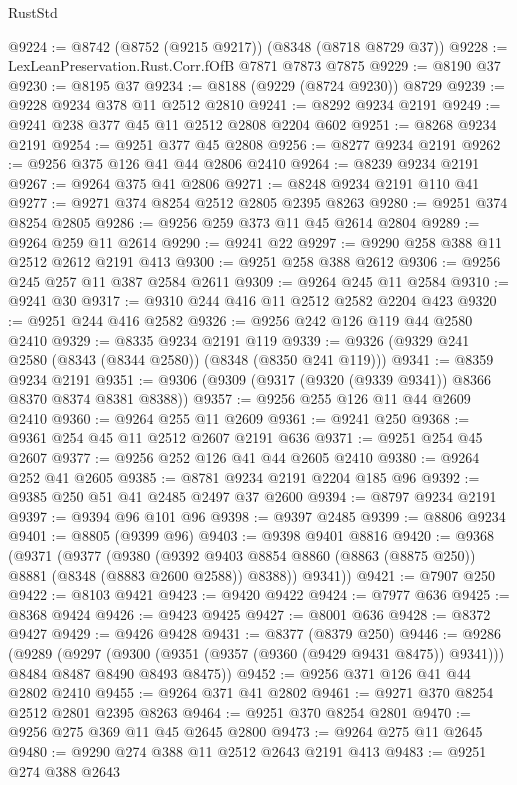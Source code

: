 \begin{lexlean}{RustStd}
\begin{coremodule}
{\begin{coremodule}
{{{{{{{{{{{{{{{{{{{{{{{{{{{{{{{{{{{{{{{{{{{{{{{{{{@9224 := @8742 (@8752 (@9215 @9217)) (@8348 (@8718 @8729 @37))
@9228 := LexLeanPreservation.Rust.Corr.fOfB @7871 @7873 @7875
@9229 := @8190 @37
@9230 := @8195 @37
@9234 := @8188 (@9229 (@8724 @9230)) @8729
@9239 := @9228 @9234 @378 @11 @2512 @2810
@9241 := @8292 @9234 @2191
@9249 := @9241 @238 @377 @45 @11 @2512 @2808 @2204 @602
@9251 := @8268 @9234 @2191
@9254 := @9251 @377 @45 @2808
@9256 := @8277 @9234 @2191
@9262 := @9256 @375 @126 @41 @44 @2806 @2410
@9264 := @8239 @9234 @2191
@9267 := @9264 @375 @41 @2806
@9271 := @8248 @9234 @2191 @110 @41
@9277 := @9271 @374 @8254 @2512 @2805 @2395 @8263
@9280 := @9251 @374 @8254 @2805
@9286 := @9256 @259 @373 @11 @45 @2614 @2804
@9289 := @9264 @259 @11 @2614
@9290 := @9241 @22
@9297 := @9290 @258 @388 @11 @2512 @2612 @2191 @413
@9300 := @9251 @258 @388 @2612
@9306 := @9256 @245 @257 @11 @387 @2584 @2611
@9309 := @9264 @245 @11 @2584
@9310 := @9241 @30
@9317 := @9310 @244 @416 @11 @2512 @2582 @2204 @423
@9320 := @9251 @244 @416 @2582
@9326 := @9256 @242 @126 @119 @44 @2580 @2410
@9329 := @8335 @9234 @2191 @119
@9339 := @9326 (@9329 @241 @2580 (@8343 (@8344 @2580)) (@8348 (@8350 @241 @119)))
@9341 := @8359 @9234 @2191
@9351 := @9306 (@9309 (@9317 (@9320 (@9339 @9341)) @8366 @8370 @8374 @8381 @8388))
@9357 := @9256 @255 @126 @11 @44 @2609 @2410
@9360 := @9264 @255 @11 @2609
@9361 := @9241 @250
@9368 := @9361 @254 @45 @11 @2512 @2607 @2191 @636
@9371 := @9251 @254 @45 @2607
@9377 := @9256 @252 @126 @41 @44 @2605 @2410
@9380 := @9264 @252 @41 @2605
@9385 := @8781 @9234 @2191 @2204 @185 @96
@9392 := @9385 @250 @51 @41 @2485 @2497 @37 @2600
@9394 := @8797 @9234 @2191
@9397 := @9394 @96 @101 @96
@9398 := @9397 @2485
@9399 := @8806 @9234
@9401 := @8805 (@9399 @96)
@9403 := @9398 @9401 @8816
@9420 := @9368
    (@9371
      (@9377
        (@9380
          (@9392 @9403 @8854 @8860 (@8863 (@8875 @250)) @8881 (@8348 (@8883 @2600 @2588)) @8388))
        @9341))
@9421 := @7907 @250
@9422 := @8103 @9421
@9423 := @9420 @9422
@9424 := @7977 @636
@9425 := @8368 @9424
@9426 := @9423 @9425
@9427 := @8001 @636
@9428 := @8372 @9427
@9429 := @9426 @9428
@9431 := @8377 (@8379 @250)
@9446 := @9286
    (@9289
      (@9297
        (@9300 (@9351 (@9357 (@9360 (@9429 @9431 @8475)) @9341)))
        @8484
        @8487
        @8490
        @8493
        @8475))
@9452 := @9256 @371 @126 @41 @44 @2802 @2410
@9455 := @9264 @371 @41 @2802
@9461 := @9271 @370 @8254 @2512 @2801 @2395 @8263
@9464 := @9251 @370 @8254 @2801
@9470 := @9256 @275 @369 @11 @45 @2645 @2800
@9473 := @9264 @275 @11 @2645
@9480 := @9290 @274 @388 @11 @2512 @2643 @2191 @413
@9483 := @9251 @274 @388 @2643
}}}}}}}}}}}}}}}}}}}}}}}}}}}}}}}}}}}}}}}}}}}}}}}}}}
\end{coremodule}}
\end{coremodule}
\end{lexlean}
